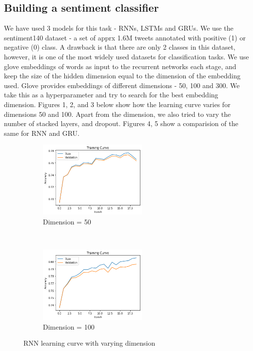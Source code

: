 \documentclass{article}
\begin{document}
\subsection{Building a sentiment classifier}
We have used 3 models for this task - RNNs, LSTMs and GRUs. We use the sentiment140 dataset - a set of apprx 1.6M tweets annotated with positive (1) or negative (0) class. A drawback is that there are only 2 classes in this dataset, however, it is one of the most widely used datasets for classification tasks. 
We use glove embeddings of words as input to the recurrent networks each stage, and keep the size of the hidden dimension equal to the dimension of the embedding used. Glove provides embeddings of different dimensions - 50, 100 and 300. We take this as a hyperparameter and try to search for the best embedding dimension. Figures 1, 2, and 3 below show how the learning curve varies for dimensions 50 and 100.
Apart from the dimension, we also tried to vary the number of stacked layers, and dropout. Figures 4, 5 show a comparision of the same for RNN and GRU.
\begin{figure}[ht!]
    \centering
    \begin{subfigure}[t]{0.5\textwidth}
        \centering
        \includegraphics[height=1.5in]{img/sa-dim-search/rnn-training-dim50}
        \caption{Dimension = 50}
    \end{subfigure}%
    ~ 
    \begin{subfigure}[t]{0.5\textwidth}
        \centering
        \includegraphics[height=1.5in]{img/sa-dim-search/rnn-training-dim100}
        \caption{Dimension = 100}
    \end{subfigure}
    \caption{RNN learning curve with varying dimension}
\end{figure}
\end{document}

